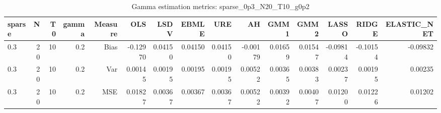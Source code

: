 \begin{table}[!htbp]\centering
\caption{Gamma estimation metrics: sparse_0p3_N20_T10_g0p2}
\label{tab:table1_sparse_0p3_N20_T10_g0p2}
\begin{tabular}{lrrrrrrrrrrrrrr}
\hline
sparse & N & T0 & gamma & Measure & OLS & LSDV & EBMLE & URE & AH & GMM1 & GMM2 & LASSO & RIDGE & ELASTIC_NET \\
\hline
0.3 & 20 & 10 & 0.2 & Bias & -0.12970 & 0.04150 & 0.04150 & 0.04150 & -0.00179 & 0.01659 & 0.01547 & -0.09814 & -0.10154 & -0.09832 \\
0.3 & 20 & 10 & 0.2 & Var & 0.00145 & 0.00195 & 0.00195 & 0.00195 & 0.00522 & 0.00365 & 0.00383 & 0.00237 & 0.00195 & 0.00235 \\
0.3 & 20 & 10 & 0.2 & MSE & 0.01827 & 0.00367 & 0.00367 & 0.00367 & 0.00522 & 0.00392 & 0.00407 & 0.01200 & 0.01226 & 0.01202 \\
\hline
\end{tabular}
\end{table}

